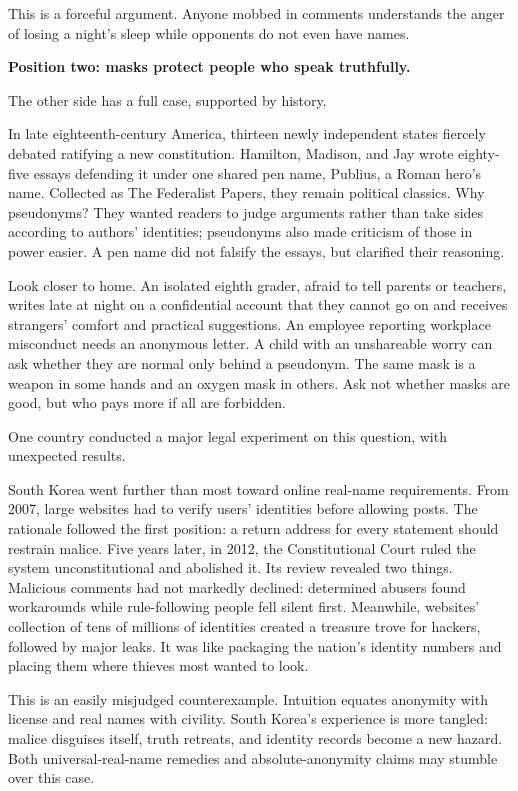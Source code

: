 This is a forceful argument. Anyone mobbed in comments understands the anger of losing a night's sleep while opponents do not even have names.

\textbf{Position two: masks protect people who speak truthfully.}

The other side has a full case, supported by history.

In late eighteenth-century America, thirteen newly independent states fiercely debated ratifying a new constitution. Hamilton, Madison, and Jay wrote eighty-five essays defending it under one shared pen name, Publius, a Roman hero's name. Collected as The Federalist Papers, they remain political classics. Why pseudonyms? They wanted readers to judge arguments rather than take sides according to authors' identities; pseudonyms also made criticism of those in power easier. A pen name did not falsify the essays, but clarified their reasoning.

Look closer to home. An isolated eighth grader, afraid to tell parents or teachers, writes late at night on a confidential account that they cannot go on and receives strangers' comfort and practical suggestions. An employee reporting workplace misconduct needs an anonymous letter. A child with an unshareable worry can ask whether they are normal only behind a pseudonym. The same mask is a weapon in some hands and an oxygen mask in others. Ask not whether masks are good, but who pays more if all are forbidden.

One country conducted a major legal experiment on this question, with unexpected results.

South Korea went further than most toward online real-name requirements. From 2007, large websites had to verify users' identities before allowing posts. The rationale followed the first position: a return address for every statement should restrain malice. Five years later, in 2012, the Constitutional Court ruled the system unconstitutional and abolished it. Its review revealed two things. Malicious comments had not markedly declined: determined abusers found workarounds while rule-following people fell silent first. Meanwhile, websites' collection of tens of millions of identities created a treasure trove for hackers, followed by major leaks. It was like packaging the nation's identity numbers and placing them where thieves most wanted to look.

This is an easily misjudged counterexample. Intuition equates anonymity with license and real names with civility. South Korea's experience is more tangled: malice disguises itself, truth retreats, and identity records become a new hazard. Both universal-real-name remedies and absolute-anonymity claims may stumble over this case.

